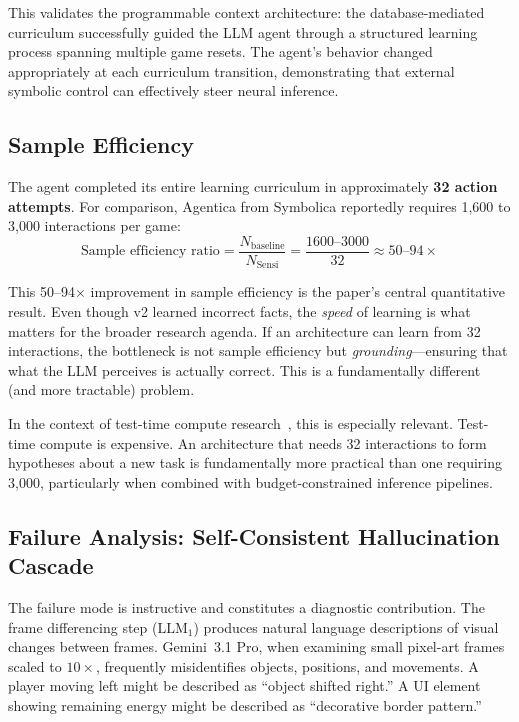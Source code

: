 \documentclass[11pt,letterpaper]{article}
\begin{document}
This validates the programmable context architecture: the database-mediated curriculum successfully guided the LLM agent through a structured learning process spanning multiple game resets. The agent's behavior changed appropriately at each curriculum transition, demonstrating that external symbolic control can effectively steer neural inference.

\subsection{Sample Efficiency}
\label{sec:efficiency}

The agent completed its entire learning curriculum in approximately \textbf{32 action attempts}. For comparison, Agentica from Symbolica reportedly requires 1,600 to 3,000 interactions per game:
\begin{equation}
  \text{Sample efficiency ratio} = \frac{N_{\text{baseline}}}{N_{\text{Sensi}}} = \frac{1600\text{--}3000}{32} \approx 50\text{--}94\times
  \label{eq:efficiency}
\end{equation}

This 50--94$\times$ improvement in sample efficiency is the paper's central quantitative result. Even though v2 learned incorrect facts, the \emph{speed} of learning is what matters for the broader research agenda. If an architecture can learn from 32 interactions, the bottleneck is not sample efficiency but \emph{grounding}---ensuring that what the LLM perceives is actually correct. This is a fundamentally different (and more tractable) problem.

In the context of test-time compute research~\citep{yuksekgonul2025tttdiscover}, this is especially relevant. Test-time compute is expensive. An architecture that needs 32 interactions to form hypotheses about a new task is fundamentally more practical than one requiring 3,000, particularly when combined with budget-constrained inference pipelines.

\subsection{Failure Analysis: Self-Consistent Hallucination Cascade}
\label{sec:failure}

The failure mode is instructive and constitutes a diagnostic contribution. The frame differencing step ($\text{LLM}_1$) produces natural language descriptions of visual changes between frames. Gemini~3.1 Pro, when examining small pixel-art frames scaled to $10\times$, frequently misidentifies objects, positions, and movements. A player moving left might be described as ``object shifted right.'' A UI element showing remaining energy might be described as ``decorative border pattern.''
\end{document}
